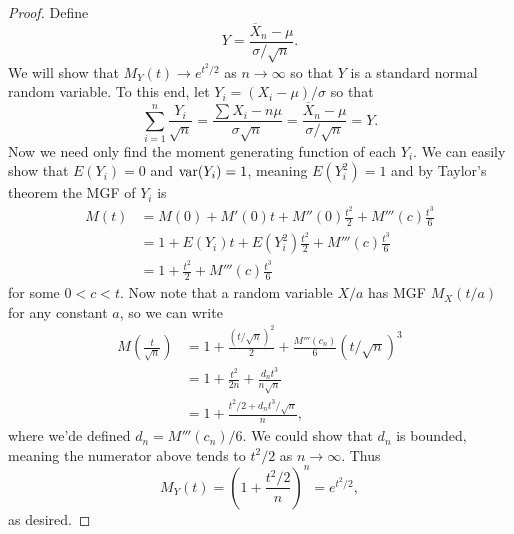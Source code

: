 \documentclass[../m157main.tex]{subfiles}
\begin{document}
\begin{proof}
    Define
    \[ Y = \frac{\overline{X}_n - \mu}{\sigma / \sqrt{n}}. \]
    We will show that $M_Y(t) \to e^{t^2 / 2}$ as $n \to \infty$ so that $Y$ is a standard normal random variable.
    To this end, let $Y_i = (X_i - \mu) / \sigma$ so that
    \[ \sum_{i=1}^{n} \frac{Y_i}{\sqrt{n}} = \frac{\sum X_i - n\mu}{\sigma \sqrt{n}} = \frac{\overline{X}_n - \mu}{\sigma / \sqrt{n}} = Y. \]
    Now we need only find the moment generating function of each $Y_i$.
    We can easily show that $E(Y_i) = 0$ and $\textrm{var}(Y_i) = 1$, meaning $E(Y_i^2) = 1$ and by Taylor's theorem the MGF of $Y_i$ is
    \begin{align*}
        M(t) &= M(0) + M'(0) t + M''(0) \frac{t^2}{2} + M'''(c) \frac{t^3}{6} \\
        &= 1 + E(Y_i) t + E(Y_i^2) \frac{t^2}{2} + M'''(c) \frac{t^3}{6} \\
        &= 1 + \frac{t^2}{2} + M'''(c) \frac{t^3}{6}
    \end{align*}
    for some $0 < c < t$.
    Now note that a random variable $X / a$ has MGF $M_X(t / a)$ for any constant $a$, so we can write
    \begin{align*}
        M \left( \frac{t}{\sqrt{n}} \right) &= 1 + \frac{(t / \sqrt{n})^2}{2} + \frac{M'''(c_n)}{6} (t / \sqrt{n})^3 \\
        &= 1 + \frac{t^2}{2n} + \frac{d_n t^3}{n \sqrt{n}} \\
        &= 1 + \frac{t^2 / 2 + d_n t^3 / \sqrt{n}}{n},
    \end{align*}
    where we'de defined $d_n = M'''(c_n) / 6$.
    We could show that $d_n$ is bounded, meaning the numerator above tends to $t^2 / 2$ as $n \to \infty$.
    Thus
    \[ M_Y(t) = \left( 1 + \frac{t^2 / 2}{n} \right)^{n} = e^{t^2 / 2}, \]
    as desired.
\end{proof}
\end{document}
